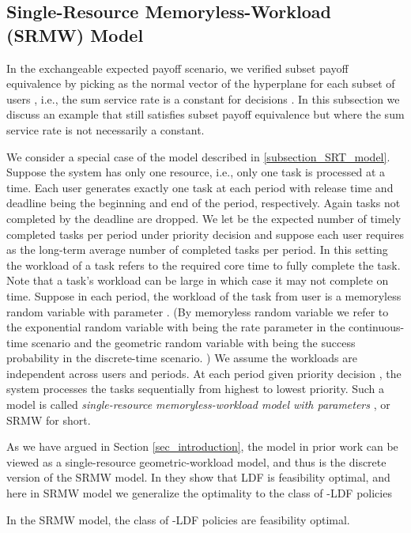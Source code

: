 \documentclass[prodmode,acmtompecs]{acmsmall}
\newcommand{\myComments}[1]{}
\newif\ifdissertation
\newcommand{\dissertationStart}{\ifdissertation  \myComments{Dissertation version: }}
\begin{document}
\dissertationStart
\subsection{Single-Resource Memoryless-Workload (SRMW) Model}

In the exchangeable expected payoff scenario, we verified subset payoff equivalence by picking  as the normal vector of the hyperplane for each subset of users , i.e., the sum service rate  is a constant for decisions . In this subsection we discuss an example that still satisfies subset payoff equivalence but where the sum service rate is not necessarily a constant. 

We consider a special case of the model described in \ref{subsection_SRT_model}. Suppose the system has only one resource, i.e., only one task is processed at a time. Each user generates exactly one task at each period with release time and deadline being the beginning and end of the period, respectively. Again tasks not completed by the deadline are dropped.
We let  be the expected number of timely completed tasks per period under priority decision  and suppose each user  requires  as the long-term average number of completed tasks per period. 
In this setting the workload of a task refers to the required core time to fully complete the task. Note that a task's workload can be large in which case it may not complete on time. 
Suppose in each period, the workload of the task from user  is a memoryless random variable with parameter . (By memoryless random variable we refer to the exponential random variable with  being the rate parameter in the continuous-time scenario and the geometric random variable with  being the success probability in the discrete-time scenario. ) We assume the workloads are independent across users and periods. At each period given priority decision , the system processes the tasks sequentially from highest to lowest priority. Such a model is called {\em single-resource memoryless-workload model with parameters }, or SRMW for short. 

As we have argued in Section \ref{sec_introduction}, the model in prior work \cite{HoK12} can be viewed as a single-resource geometric-workload model, and thus is the discrete version of the SRMW model. In \cite{HoK12} they show that LDF is feasibility optimal, and here in SRMW model we generalize the optimality to the class of -LDF policies

\begin{corollary}
\label{corollary_SCMW}
In the SRMW model, the class of -LDF policies are feasibility optimal. 
\end{corollary}
\end{document}
